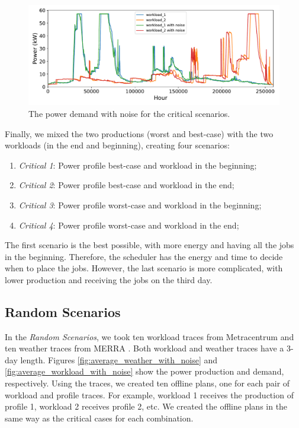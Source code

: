 \begin{figure}[!htb]
    \centering
    \includegraphics[scale=0.58]{Images/Compensations/critical_jobs_arriving_with_noise.pdf}
    \caption{The power demand with noise for the critical scenarios.}
    \label{fig:critical_workload_with_noise}
\end{figure}

Finally, we mixed the two productions (worst and best-case) with the two workloads (in the end and beginning), creating four scenarios:

\begin{enumerate}
    \item \emph{Critical 1}: Power profile best-case and workload in the beginning;
    \item \emph{Critical 2}: Power profile best-case and workload in the end;
    \item \emph{Critical 3}: Power profile worst-case and workload in the beginning;
    \item \emph{Critical 4}: Power profile worst-case and workload in the end;
\end{enumerate}

The first scenario is the best possible, with more energy and having all the jobs in the beginning. Therefore, the scheduler has the energy and time to decide when to place the jobs. However, the last scenario is more complicated, with lower production and receiving the jobs on the third day.

\subsection{Random Scenarios}

In the \emph{Random Scenarios}, we took ten workload traces from Metracentrum \cite{klusavcek2015real} and ten weather traces from MERRA \cite{rienecker2011merra}. Both workload and weather traces have a 3-day length. Figures \ref{fig:average_weather_with_noise} and \ref{fig:average_workload_with_noise} show the power production and demand, respectively. Using the traces, we created ten offline plans, one for each pair of workload and profile traces. For example, workload 1 receives the production of profile 1, workload 2 receives profile 2, etc. We created the offline plans in the same way as the critical cases for each combination.

